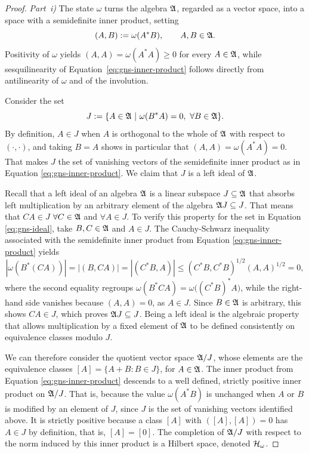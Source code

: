 \begin{proof}
	\textit{Part~i)} The state $\omega$ turns the algebra $\mathfrak{A}$, regarded as a vector space, into a space with a semidefinite inner product, setting
	\begin{equation}
		\label{eq:gns-inner-product}
		(A,B) := \omega(A^*B), \qquad A,B \in \mathfrak{A}.
	\end{equation}
	Positivity of $\omega$ yields $(A,A) = \omega(A^*A) \ge 0$ for every $A \in \mathfrak{A}$, while sesquilinearity of Equation~\eqref{eq:gns-inner-product} follows directly from antilinearity  of $\omega$ and of the involution. 
	
	\noindent Consider the set
	\begin{equation}
		\label{eq:gns-ideal}
		J := \{A \in \mathfrak{A} \ |\ \omega(B^*A) = 0, \ \forall B \in \mathfrak{A}\}.
	\end{equation}
	By definition, $A \in J$ when $A$ is orthogonal to the whole of $\mathfrak{A}$ with respect to $(\cdot,\cdot)$, and taking $B=A$ shows in particular that $(A,A) = \omega(A^*A) = 0$. That makes $J$ the set of vanishing vectors of the semidefinite inner product as in Equation \eqref{eq:gns-inner-product}. We claim that $J$ is a left ideal of $\mathfrak{A}$. 
	
	Recall that a left ideal of an algebra $\mathfrak{A}$ is a linear subspace $J \subseteq \mathfrak{A}$ that absorbs left multiplication by an arbitrary element of the algebra $\mathfrak{A} J \subseteq J$. That means that $CA \in J$ $\forall C \in \mathfrak{A}$ and $\forall A \in J$. To verify this property for the set in Equation \eqref{eq:gns-ideal}, take $B,C \in \mathfrak{A}$ and $A \in J$. The Cauchy-Schwarz inequality associated with the semidefinite inner product from Equation \eqref{eq:gns-inner-product} yields
	\begin{equation}
		|\omega(B^*(CA))| = |(B,CA)| = |(C^*B,A)| \le (C^*B,C^*B)^{1/2}(A,A)^{1/2} = 0,
	\end{equation}
	where the second equality regroups $\omega(B^*CA) = \omega\big((C^*B)^*A\big)$, while the right-hand side vanishes because $(A,A) = 0$, as $A \in J$. Since $B \in \mathfrak{A}$ is arbitrary, this shows $CA \in J$, which proves $\mathfrak{A} J \subseteq J$. Being a left ideal is the algebraic property that allows multiplication by a fixed element of $\mathfrak{A}$ to be defined consistently on equivalence classes modulo $J$. 
	
	We can therefore consider the quotient vector space $\mathfrak{A} / J$, whose elements are the equivalence classes $[A] = \{A + B : B \in J\}$, for $A \in \mathfrak{A}$. The inner product from Equation \eqref{eq:gns-inner-product} descends to a well defined, strictly positive inner product on $\mathfrak{A}/J$. That is, because the value $\omega(A^*B)$ is unchanged when $A$ or $B$ is modified by an element of $J$, since $J$ is the set of vanishing vectors identified above. It is strictly positive because a class $[A]$ with $([A],[A]) = 0$ has $A \in J$ by definition, that is, $[A] = [0]$. The completion of $\mathfrak{A}/J$ with respect to the norm induced by this inner product is a Hilbert space, denoted $\H_\omega$.
	

\end{proof}
